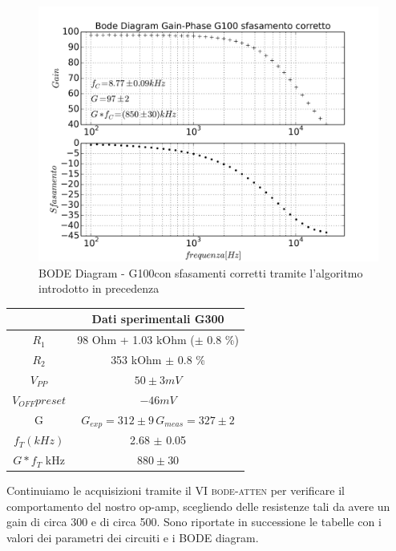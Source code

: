 \documentclass[journal, a4paper]{IEEEtran}
\begin{document}
\begin{figure}
\centering
\includegraphics[width=0.9\linewidth]{./es_8_bode_diag_sfasacorr}
\caption{BODE Diagram - G100con sfasamenti corretti tramite l'algoritmo introdotto in precedenza}
\label{fig:es_8_bode_diag_sfasacorr}
\end{figure}

{
\centering
\begin{tabular}{|c|c|}
\hline  &  \textbf{Dati sperimentali G300} \\ 
\hline $R_1$  &  98 \si{Ohm} + 1.03 \si{kOhm} ($\pm$ 0.8 \%) \\ 
\hline $R_2$ & 353 \si{kOhm} $\pm$ 0.8 \%  \\ 
\hline $V_{PP}$ & $50  \pm 3 \si{mV} $ \\ 
\hline $V_{OFF} preset$ & $ -46  \si{mV} $ \\
\hline G &  $G_{exp}  = 312 \pm 9  \, G_{meas} = 327 \pm 2 $ \\ 
\hline $f_T (kHz)$ &  2.68 $\pm$ 0.05 \\
\hline $G*f_{T}$ \si{kHz} & $ 880 \pm 30 $\\
\hline
\end{tabular}
 
}


Continuiamo le acquisizioni tramite il VI \textsc{bode-atten} per verificare il comportamento del nostro op-amp, scegliendo delle resistenze tali da avere un gain di circa 300 e di circa 500. Sono riportate in successione le tabelle con i valori dei parametri dei circuiti e i BODE diagram. \\
\end{document}
